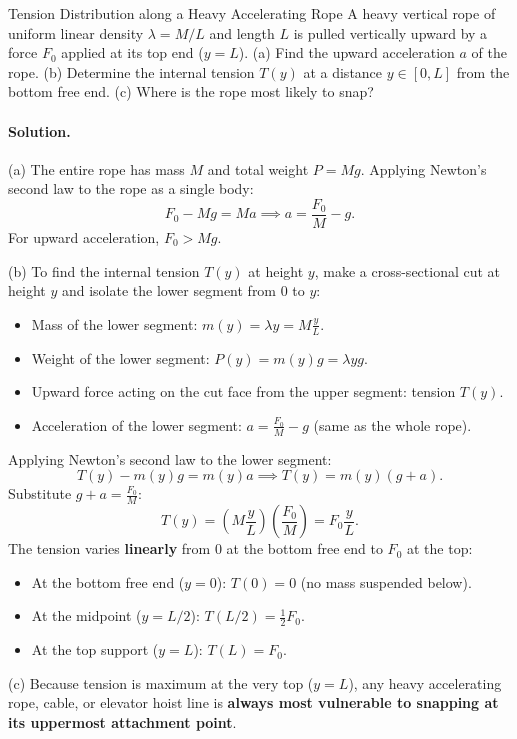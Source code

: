 \begin{workedexample}{Tension Distribution along a Heavy Accelerating Rope}
A heavy vertical rope of uniform linear density $\lambda = M/L$ and length $L$ is pulled vertically upward by a force $F_0$ applied at its top end ($y = L$).
(a) Find the upward acceleration $a$ of the rope.
(b) Determine the internal tension $T(y)$ at a distance $y \in [0, L]$ from the bottom free end.
(c) Where is the rope most likely to snap?

\paragraph{Solution.}

(a) The entire rope has mass $M$ and total weight $P = Mg$.
Applying Newton's second law to the rope as a single body:
\[
F_0 - Mg = Ma \implies \boxed{a = \frac{F_0}{M} - g.}
\]
For upward acceleration, $F_0 > Mg$.

(b) To find the internal tension $T(y)$ at height $y$, make a cross-sectional cut at height $y$ and isolate the lower segment from $0$ to $y$:
\begin{itemize}[leftmargin=1.4em,itemsep=2pt]
  \item Mass of the lower segment: $m(y) = \lambda y = M\frac{y}{L}$.
  \item Weight of the lower segment: $P(y) = m(y)g = \lambda y g$.
  \item Upward force acting on the cut face from the upper segment: tension $T(y)$.
  \item Acceleration of the lower segment: $a = \frac{F_0}{M} - g$ (same as the whole rope).
\end{itemize}
Applying Newton's second law to the lower segment:
\[
T(y) - m(y)g = m(y)a \implies T(y) = m(y)(g + a).
\]
Substitute $g + a = \frac{F_0}{M}$:
\[
T(y) = \left(M\frac{y}{L}\right)\left(\frac{F_0}{M}\right) = \boxed{F_0\frac{y}{L}.}
\]
The tension varies \textbf{linearly} from $0$ at the bottom free end to $F_0$ at the top:
\begin{itemize}[leftmargin=1.4em,itemsep=2pt]
  \item At the bottom free end ($y = 0$): $T(0) = 0$ (no mass suspended below).
  \item At the midpoint ($y = L/2$): $T(L/2) = \frac{1}{2}F_0$.
  \item At the top support ($y = L$): $T(L) = F_0$.
\end{itemize}

(c) Because tension is maximum at the very top ($y = L$), any heavy accelerating rope, cable, or elevator hoist line is \textbf{always most vulnerable to snapping at its uppermost attachment point}.
\end{workedexample}
